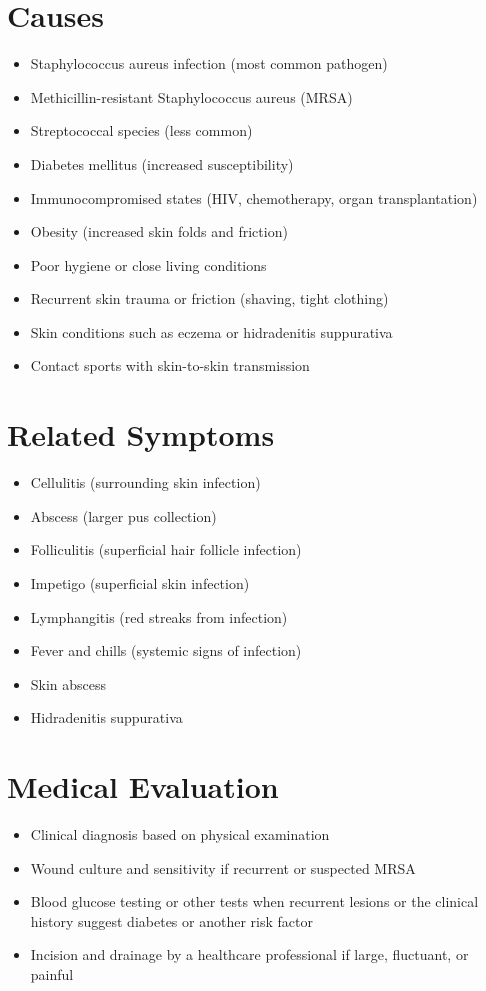 \section*{Causes}
\begin{itemize}
\item Staphylococcus aureus infection (most common pathogen)
\item Methicillin-resistant Staphylococcus aureus (MRSA)
\item Streptococcal species (less common)
\item Diabetes mellitus (increased susceptibility)
\item Immunocompromised states (HIV, chemotherapy, organ transplantation)
\item Obesity (increased skin folds and friction)
\item Poor hygiene or close living conditions
\item Recurrent skin trauma or friction (shaving, tight clothing)
\item Skin conditions such as eczema or hidradenitis suppurativa
\item Contact sports with skin-to-skin transmission
\end{itemize}

\section*{Related Symptoms}
\begin{itemize}
\item Cellulitis (surrounding skin infection)
\item Abscess (larger pus collection)
\item Folliculitis (superficial hair follicle infection)
\item Impetigo (superficial skin infection)
\item Lymphangitis (red streaks from infection)
\item Fever and chills (systemic signs of infection)
\item Skin abscess
\item Hidradenitis suppurativa
\end{itemize}

\section*{Medical Evaluation}
\begin{itemize}
\item Clinical diagnosis based on physical examination
\item Wound culture and sensitivity if recurrent or suspected MRSA
\item Blood glucose testing or other tests when recurrent lesions or the clinical history suggest diabetes or another risk factor
\item Incision and drainage by a healthcare professional if large, fluctuant, or painful
\end{itemize}

